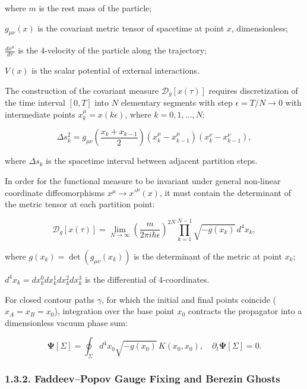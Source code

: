 where $m$ is the rest mass of the particle;  

$g_{\mu\nu}(x)$ is the covariant metric tensor of spacetime at point $x$, dimensionless;  

$\frac{dx^\mu}{d\tau}$ is the 4-velocity of the particle along the trajectory;  

$V(x)$ is the scalar potential of external interactions.

The construction of the covariant measure $\mathcal{D}_g[x(\tau)]$ requires discretization of the time interval $[0, T]$ into $N$ elementary segments with step $\epsilon = T/N \to 0$ with intermediate points $x_k^\mu = x(k\epsilon)$, where $k = 0, 1, \dots, N$:

\begin{equation}\label{eq:1.35}\tag{1.35}
\Delta s_k^2 = g_{\mu\nu}\left(\frac{x_k + x_{k-1}}{2}\right) (x_k^\mu - x_{k-1}^\mu) (x_k^\nu - x_{k-1}^\nu),
\end{equation}

where $\Delta s_k$ is the spacetime interval between adjacent partition steps.

In order for the functional measure to be invariant under general non-linear coordinate diffeomorphisms $x^\mu \to x'^\mu(x)$, it must contain the determinant of the metric tensor at each partition point:

\begin{equation}\label{eq:1.36}\tag{1.36}
\mathcal{D}_g[x(\tau)] = \lim_{N\to\infty} \left( \frac{m}{2\pi i \hbar \epsilon} \right)^{2N} \prod_{k=1}^{N-1} \sqrt{-g(x_k)} \, d^4x_k,
\end{equation}

where $g(x_k) = \det(g_{\mu\nu}(x_k))$ is the determinant of the metric at point $x_k$;  

$d^4x_k = dx_k^0 dx_k^1 dx_k^2 dx_k^3$ is the differential of 4-coordinates.

For closed contour paths $\gamma$, for which the initial and final points coincide ($x_A = x_B = x_0$), integration over the base point $x_0$ contracts the propagator into a dimensionless vacuum phase sum:

\begin{equation}\label{eq:1.41}\tag{1.41}
\mathbf{\Psi}[\Sigma] = \oint_{\Sigma} d^4x_0 \sqrt{-g(x_0)} \, K(x_0, x_0), \quad \partial_t \mathbf{\Psi}[\Sigma] = 0.
\end{equation}


\subsubsection{1.3.2. Faddeev--Popov Gauge Fixing and Berezin Ghosts}\label{sec:1.3.2}

